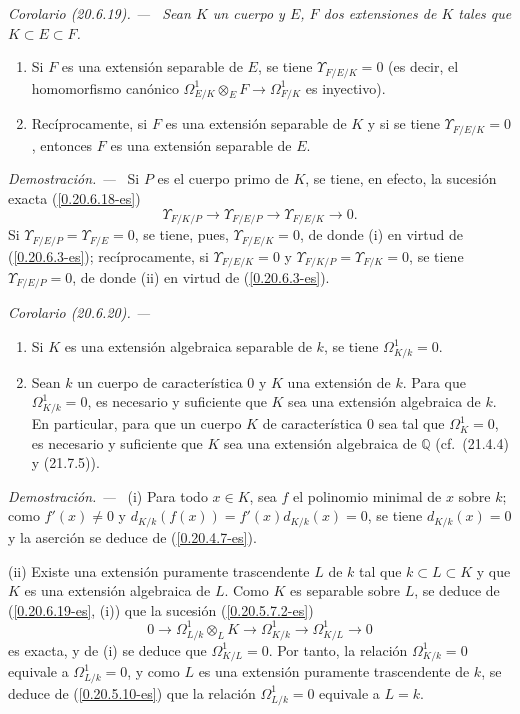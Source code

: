 \documentclass[10pt,oneside]{book}
\makeatletter
\newcommand{\sref}[1]{\textup{(\ref{#1})}}
\newcommand{\setmanualcurrentlabel}[1]{\def\@currentlabel{#1}}
\newcommand{\oldpage}[2][]{%
  \setcounter{footnote}{0}%
  \marginpar{\scriptsize\textbf{#1}~|~#2}\ignorespaces}
\newenvironment{corollary}[1][]{%
  \setmanualcurrentlabel{#1}\par\medskip\noindent\itshape Corolario (#1). ---\ }{\par}
\newenvironment{proof}{%
  \par\medskip\noindent\textit{Demostración. ---\ }}{\par}
\makeatother
\begin{document}
\begin{corollary}[20.6.19]
\label{0.20.6.19-es}
Sean $K$ un cuerpo y $E$, $F$ dos extensiones de $K$ tales que
$K\subset E\subset F$.
\begin{enumerate}
  \item[\rm(i)] Si $F$ es una extensión separable de $E$, se tiene
  $\Upsilon_{F/E/K}=0$ (es decir, el homomorfismo canónico
  $\Omega^1_{E/K}\otimes_E F\to\Omega^1_{F/K}$ es inyectivo).
  \item[\rm(ii)] Recíprocamente, si $F$ es una extensión separable de $K$ y
  si se tiene $\Upsilon_{F/E/K}=0$, entonces $F$ es una extensión separable de
  $E$.
\end{enumerate}
\end{corollary}

\begin{proof}
Si $P$ es el cuerpo primo de $K$, se tiene, en efecto, la sucesión exacta
\sref{0.20.6.18-es}
\[
  \Upsilon_{F/K/P}\to\Upsilon_{F/E/P}\to\Upsilon_{F/E/K}\to0.
\]
Si $\Upsilon_{F/E/P}=\Upsilon_{F/E}=0$, se tiene, pues,
$\Upsilon_{F/E/K}=0$, de donde (i) en virtud de \sref{0.20.6.3-es};
recíprocamente, si $\Upsilon_{F/E/K}=0$ y
$\Upsilon_{F/K/P}=\Upsilon_{F/K}=0$, se tiene
$\Upsilon_{F/E/P}=0$, de donde (ii) en virtud de \sref{0.20.6.3-es}.
\end{proof}

\oldpage[0\textsubscript{IV-1}]{144}
\begin{corollary}[20.6.20]
\label{0.20.6.20-es}
\begin{enumerate}
  \item[\rm(i)] Si $K$ es una extensión algebraica separable de $k$, se tiene
  $\Omega^1_{K/k}=0$.
  \item[\rm(ii)] Sean $k$ un cuerpo de característica 0 y $K$ una extensión
  de $k$. Para que $\Omega^1_{K/k}=0$, es necesario y suficiente que $K$ sea una
  extensión algebraica de $k$. En particular, para que un cuerpo $K$ de
  característica 0 sea tal que $\Omega^1_K=0$, es necesario y suficiente que
  $K$ sea una extensión algebraica de $\mathbb{Q}$ \textup{(cf.\ (21.4.4) y
  (21.7.5))}.
\end{enumerate}
\end{corollary}

\begin{proof}
(i) Para todo $x\in K$, sea $f$ el polinomio minimal de $x$ sobre $k$; como
$f'(x)\ne0$ y $d_{K/k}(f(x))=f'(x)d_{K/k}(x)=0$, se tiene
$d_{K/k}(x)=0$ y la aserción se deduce de \sref{0.20.4.7-es}.

(ii) Existe una extensión puramente trascendente $L$ de $k$ tal que
$k\subset L\subset K$ y que $K$ es una extensión algebraica de $L$.
Como $K$ es separable sobre $L$, se deduce de (\ref{0.20.6.19-es}, (i)) que
la sucesión \sref{0.20.5.7.2-es}
\[
  0\to\Omega^1_{L/k}\otimes_L K\to\Omega^1_{K/k}
  \to\Omega^1_{K/L}\to0
\]
es exacta, y de (i) se deduce que $\Omega^1_{K/L}=0$. Por tanto, la relación
$\Omega^1_{K/k}=0$ equivale a $\Omega^1_{L/k}=0$, y como
$L$ es una extensión puramente trascendente de $k$, se deduce de \sref{0.20.5.10-es} que
la relación $\Omega^1_{L/k}=0$ equivale a $L=k$.
\end{proof}
\end{document}
